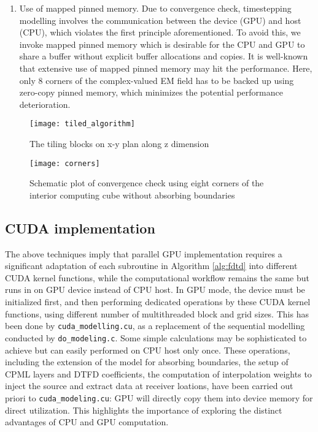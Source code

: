 \documentclass[a4paper,10pt]{article}
\begin{document}
\begin{enumerate}
\item Use of mapped pinned memory. Due to convergence check, timestepping modelling involves the communication between the device (GPU) and host (CPU), which violates the first principle aforementioned. To avoid this, we invoke mapped pinned memory which is  desirable for the CPU and GPU to share a buffer without explicit buffer allocations and copies. It is well-known that extensive use of mapped pinned memory may hit the performance. Here, only 8 corners of the complex-valued EM field has to be backed up using zero-copy pinned memory, which minimizes the potential performance deterioration.

\end{enumerate}

\begin{figure}[!htb]
  \centering
  \texttt{[image: tiled\_algorithm]}
  \caption{The tiling blocks on x-y plan along z dimension}\label{fig:diagram}
\end{figure}

\begin{figure}[!htb]
  \centering
  \texttt{[image: corners]}
  \caption{Schematic plot of convergence check using eight corners of the interior computing cube without absorbing boundaries}\label{fig:corners}
\end{figure}

\subsection{CUDA implementation}

The above techniques imply that parallel GPU implementation requires a significant adaptation of each subroutine in Algorithm \ref{alg:fdtd} into different CUDA kernel functions, while the computational workflow remains the same but runs in on GPU device instead of CPU host. In GPU mode, the device must be initialized first, and then performing dedicated operations by these CUDA kernel functions, using different number of multithreaded block and grid sizes. This has been done by \verb|cuda_modelling.cu|, as a replacement of the sequential modelling conducted by \verb|do_modeling.c|.
Some simple calculations may be sophisticated to achieve but can easily performed on CPU host only once. These operations, including the extension of the model for absorbing boundaries, the setup of CPML layers and DTFD coefficients, the computation of interpolation weights to inject the source and extract data at receiver loations, have been carried out priori to \verb|cuda_modeling.cu|: GPU will directly copy them into device memory for direct utilization. This highlights the importance of exploring the distinct advantages of CPU and GPU computation.
\end{document}
